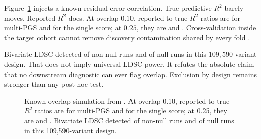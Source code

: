 \documentclass[11pt,a4paper]{article}
\newcommand{\Rtwo}{\(R^2\)}
\begin{document}
Figure~\ref{fig:overlap} injects a known residual-error
correlation. True predictive \Rtwo{} barely moves. Reported
\Rtwo{} does. At overlap \(0.10\), reported-to-true \Rtwo{}
ratios are \ReportOverlapMultiRatioTen{} for multi-PGS and
\ReportOverlapSingleRatioTen{} for the single score; at
\(0.25\), they are \ReportOverlapMultiRatioTwentyFive{} and
\ReportOverlapSingleRatioTwentyFive. Cross-validation inside
the target cohort cannot remove discovery contamination shared
by every fold \cite{wray2013}.

Bivariate LDSC detected \ReportOverlapDetectedNonnull{} of
\ReportOverlapNonnullReplicates{} non-null runs and
\ReportOverlapDetectedNull{} of \ReportOverlapNullReplicates{}
null runs in this \(109{,}590\)-variant design. That does not
imply universal LDSC power. It refutes the absolute claim that
no downstream diagnostic can ever flag overlap. Exclusion by
design remains stronger than any post hoc test.

\begin{figure}[ht]
\centering
{}
\caption{Known-overlap simulation from
\protect{}. At overlap 0.10,
reported-to-true \Rtwo{} ratios are
\ReportOverlapMultiRatioTen{} for multi-PGS and
\ReportOverlapSingleRatioTen{} for the single score; at 0.25,
they are \ReportOverlapMultiRatioTwentyFive{} and
\ReportOverlapSingleRatioTwentyFive. Bivariate LDSC detected
\ReportOverlapDetectedNonnull{} of
\ReportOverlapNonnullReplicates{} non-null runs and
\ReportOverlapDetectedNull{} of \ReportOverlapNullReplicates{}
null runs in this 109,590-variant design.}
\label{fig:overlap}
\end{figure}
\end{document}
